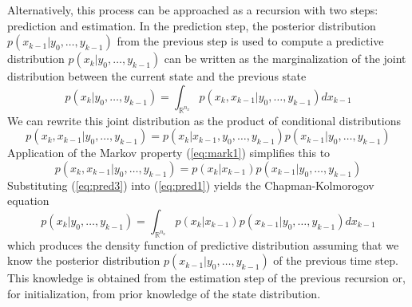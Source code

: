 Alternatively, this process can be approached as a recursion with two steps: prediction and estimation. In the prediction step, the posterior distribution $p(x_{k-1}|y_{0},\hdots,y_{k-1})$ from the previous step is used to compute a predictive distribution $p(x_{k}|y_{0},\hdots,y_{k-1})$ can be written as the marginalization of the joint distribution between the current state and the previous state
\begin{equation} \label{eq:pred1}
    p(x_{k}|y_{0},\hdots,y_{k-1}) = \int_{\mathbb{R}^{n_{x}}}p(x_{k},x_{k-1}|y_{0},\hdots,y_{k-1}) dx_{k-1}
\end{equation}
We can rewrite this joint distribution as the product of conditional distributions
\begin{equation} \label{eq:pred2}
    p(x_{k},x_{k-1}|y_{0},\hdots,y_{k-1}) = p(x_{k}|x_{k-1},y_{0},\hdots,y_{k-1})p(x_{k-1}|y_{0},\hdots,y_{k-1}) 
\end{equation}
Application of the Markov property (\ref{eq:mark1}) simplifies this to
\begin{equation} \label{eq:pred3}
    p(x_{k},x_{k-1}|y_{0},\hdots,y_{k-1}) = p(x_{k}|x_{k-1})p(x_{k-1}|y_{0},\hdots,y_{k-1})
\end{equation}
Substituting (\ref{eq:pred3}) into (\ref{eq:pred1}) yields the Chapman-Kolmorogov equation
\begin{equation}\label{eq:pred4}
     p(x_{k}|y_{0},\hdots,y_{k-1}) = \int_{\mathbb{R}^{n_{x}}}p(x_{k}|x_{k-1})p(x_{k-1}|y_{0},\hdots,y_{k-1}) dx_{k-1}
\end{equation}
which produces the density function of predictive distribution assuming that we know the posterior distribution $p(x_{k-1}|y_{0},\hdots,y_{k-1})$ of the previous time step. This knowledge is obtained from the estimation step of the previous recursion or, for initialization, from prior knowledge of the state distribution.


